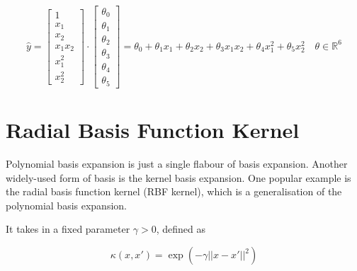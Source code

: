 \begin{equation}
    \hat{y} = \begin{bmatrix} 1 \\ x_1 \\ x_2 \\ x_1x_2 \\ x_1^2 \\ x_2^2 \end{bmatrix} \cdot  \begin{bmatrix} \theta_0 \\ \theta_1 \\ \theta_2 \\ \theta_3 \\ \theta_4 \\ \theta_5 \end{bmatrix} = \theta_0 + \theta_1 x_1 + \theta_2 x_2 + \theta_3 x_1x_2 + \theta_4 x_1^2 + \theta_5 x_2^2 \quad \theta \in \mathbb{R}^6
\end{equation}

\section{Radial Basis Function Kernel}

Polynomial basis expansion is just a single flabour of basis expansion. Another widely-used form of basis is the kernel basis expansion. One popular example is the radial basis function kernel (RBF kernel), which is a generalisation of the polynomial basis expansion. \bigskip

It takes in a fixed parameter $\gamma > 0$, defined as

\begin{equation}
    \kappa(x, x') = \exp(-\gamma ||x - x'||^2)
\end{equation}

